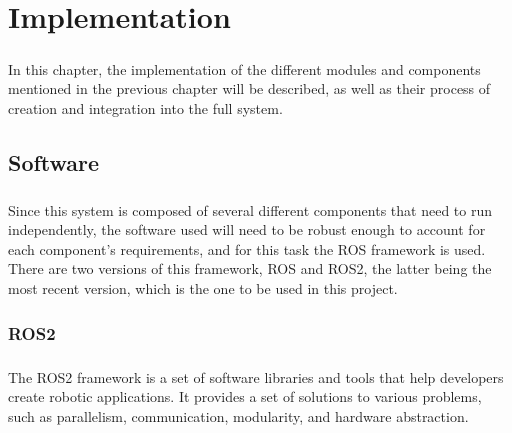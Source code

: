 
%

\chapter{Implementation}
\label{cha:implementation}

\paragraph{}In this chapter, the implementation of the different modules 
and components mentioned in the previous chapter will be described, 
as well as their process of creation and integration into the 
full system.

\section{Software}
\label{sec:software}
\paragraph{}Since this system is composed of several different components that need 
to run independently, the software used will need to be robust enough to account for 
each component's requirements, and for this task the \gls{ROS} framework is used.
There are two versions of this framework, \gls{ROS} and \gls{ROS2}, the latter being the 
most recent version, which is the one to be used in this project.

\subsection{ROS2}
\label{subsec:ros2}
\paragraph{}The \gls{ROS2} framework is a set of software libraries and tools that 
help developers create robotic applications. It provides a set of solutions to various 
problems, such as parallelism, communication, modularity, and hardware abstraction.


